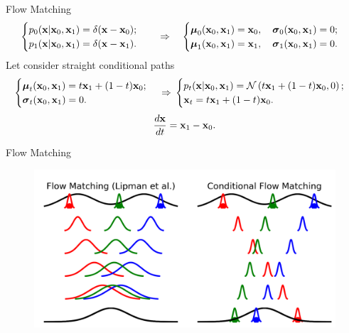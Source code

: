 \begin{frame}{Flow Matching}
	\[
		\begin{cases}
			p_0(\mathbf{x} | \mathbf{x}_0, \mathbf{x}_1) = \delta(\mathbf{x} - \mathbf{x}_0); \\
			p_1(\mathbf{x} | \mathbf{x}_0, \mathbf{x}_1) = \delta(\mathbf{x} - \mathbf{x}_1).
		\end{cases}
		\quad \Rightarrow \quad
		\begin{cases}
			\boldsymbol{\mu}_0(\mathbf{x}_0, \mathbf{x}_1) = \mathbf{x}_0, \quad \boldsymbol{\sigma}_0(\mathbf{x}_0, \mathbf{x}_1) = 0; \\
			\boldsymbol{\mu}_1(\mathbf{x}_0, \mathbf{x}_1) = \mathbf{x}_1, \quad \boldsymbol{\sigma}_1(\mathbf{x}_0, \mathbf{x}_1) = 0.
		\end{cases}
	\]
	Let consider straight conditional paths	
	\[
		\begin{cases}
			\boldsymbol{\mu}_t(\mathbf{x}_0, \mathbf{x}_1) = t \mathbf{x}_1 + (1 - t) \mathbf{x}_0; \\
			\boldsymbol{\sigma}_t(\mathbf{x}_0, \mathbf{x}_1) = 0.
		\end{cases}
		\, \Rightarrow \, 
		\begin{cases}
			p_t(\mathbf{x} | \mathbf{x}_0, \mathbf{x}_1) = \mathcal{N}\left(t \mathbf{x}_1 + (1-t) \mathbf{x}_0, 0\right); \\
		 	\mathbf{x}_t = t \mathbf{x}_1 + (1 - t) \mathbf{x}_0. \\
		 \end{cases}
	\]
	\[
		 \frac{d\mathbf{x}}{dt} = \mathbf{x}_1 - \mathbf{x}_0.
	\]
\end{frame}
\begin{frame}{Flow Matching}
	\begin{figure}
		\centering
		\includegraphics[width=\linewidth]{figs/compare_conditionings}
	\end{figure}
\end{frame}
